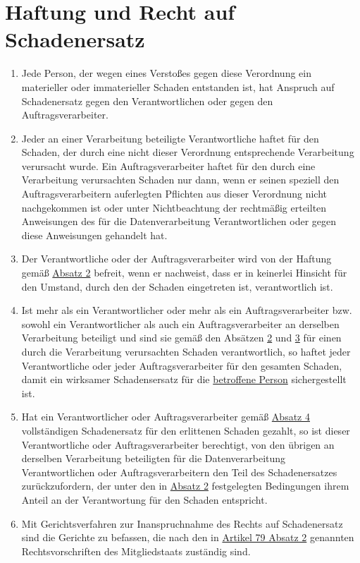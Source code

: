 \chapter{Haftung und Recht auf Schadenersatz}
\label{ch:82}


\begin{enumerate}

  \item Jede Person, der wegen eines Verstoßes gegen diese Verordnung ein materieller oder immaterieller Schaden
   entstanden ist, hat Anspruch auf Schadenersatz gegen den Verantwortlichen oder gegen den Auftragsverarbeiter.
  \label{itm:82-1}

  \item Jeder an einer Verarbeitung beteiligte Verantwortliche haftet für den Schaden, der durch eine nicht dieser
   Verordnung entsprechende Verarbeitung verursacht wurde. Ein Auftragsverarbeiter haftet für den durch eine
   Verarbeitung verursachten Schaden nur dann, wenn er seinen speziell den Auftragsverarbeitern auferlegten Pflichten
   aus dieser Verordnung nicht nachgekommen ist oder unter Nichtbeachtung der rechtmäßig erteilten Anweisungen des für
   die Datenverarbeitung Verantwortlichen oder gegen diese Anweisungen gehandelt hat.
  \label{itm:82-2}

  \item Der Verantwortliche oder der Auftragsverarbeiter wird von der Haftung gemäß \hyperref[itm:82-2]{Absatz 2}
   befreit, wenn er nachweist, dass er in keinerlei Hinsicht für den Umstand, durch den der Schaden eingetreten ist,
   verantwortlich ist.
  \label{itm:82-3}

  \item Ist mehr als ein Verantwortlicher oder mehr als ein Auftragsverarbeiter bzw. sowohl ein Verantwortlicher als
   auch ein Auftragsverarbeiter an derselben Verarbeitung beteiligt und sind sie gemäß den Absätzen \hyperref[itm:82-2]
   {2} und \hyperref[itm:82-3]{3} für einen durch die Verarbeitung verursachten Schaden verantwortlich, so haftet jeder
   Verantwortliche oder jeder Auftragsverarbeiter für den gesamten Schaden, damit ein wirksamer Schadensersatz für die
   \hyperref[itm:04-1]{betroffene Person} sichergestellt ist.
  \label{itm:82-4}

  \item Hat ein Verantwortlicher oder Auftragsverarbeiter gemäß \hyperref[itm:82-4]{Absatz 4} vollständigen
   Schadenersatz für den erlittenen Schaden gezahlt, so ist dieser Verantwortliche oder Auftragsverarbeiter berechtigt,
   von den übrigen an derselben Verarbeitung beteiligten für die Datenverarbeitung Verantwortlichen oder
   Auftragsverarbeitern den Teil des Schadenersatzes zurückzufordern, der unter den in \hyperref[itm:82-2]{Absatz 2}
   festgelegten Bedingungen ihrem Anteil an der Verantwortung für den Schaden entspricht.
  \label{itm:82-5}

  \item Mit Gerichtsverfahren zur Inanspruchnahme des Rechts auf Schadenersatz sind die Gerichte zu befassen, die nach
   den in \hyperref[itm:79-2]{Artikel 79 Absatz 2} genannten Rechtsvorschriften des Mitgliedstaats zuständig sind.
  \label{itm:82-6}

\end{enumerate}


